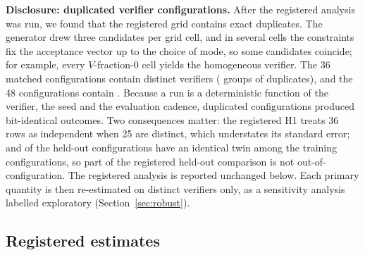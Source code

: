 \textbf{Disclosure: duplicated verifier configurations.} After the registered analysis was run, we found that the registered grid contains exact duplicates. The generator drew three candidates per grid cell, and in several cells the constraints fix the acceptance vector up to the choice of mode, so some candidates coincide; for example, every $V$-fraction-0 cell yields the homogeneous verifier. The 36 matched configurations contain \NuniqueMatched{} distinct verifiers (\NdupGroups{} groups of duplicates), and the 48 configurations contain \NuniqueAll. Because a run is a deterministic function of the verifier, the seed and the evaluation cadence, duplicated configurations produced bit-identical outcomes. Two consequences matter: the registered H1 treats 36 rows as independent when 25 are distinct, which understates its standard error; and \NheldTwin{} of the \NheldOut{} held-out configurations have an identical twin among the training configurations, so part of the registered held-out comparison is not out-of-configuration. The registered analysis is reported unchanged below. Each primary quantity is then re-estimated on distinct verifiers only, as a sensitivity analysis labelled exploratory (Section~\ref{sec:robust}).

\subsection{Registered estimates}

